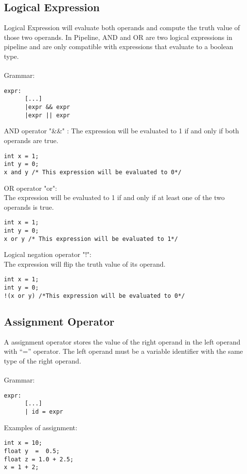 \documentclass[./LRM_main.tex]{subfiles}
\begin{document}
\subsection{Logical Expression}
Logical Expression will evaluate both operands and compute the truth value of those two operands. In Pipeline, AND and OR are two logical expressions in pipeline and are only compatible with expressions that evaluate to a boolean type.\\
\vspace{1 mm}\\
Grammar:
\begin{lstlisting}
expr:
  	  [...]   
      |expr && expr
      |expr || expr

\end{lstlisting}
AND operator "\&\&" :
The expression will be evaluated to 1 if and only if both operands are true.
\begin{lstlisting}
int x = 1;
int y = 0;
x and y /* This expression will be evaluated to 0*/
\end{lstlisting}
OR operator "or":\\
The expression will be evaluated to 1 if and only if at least one of the two operands is true.
\begin{lstlisting}
int x = 1;
int y = 0;
x or y /* This expression will be evaluated to 1*/
\end{lstlisting}
Logical negation operator "!":\\
The expression will flip the truth value of its operand.
\begin{lstlisting}
int x = 1;
int y = 0;
!(x or y) /*This expression will be evaluated to 0*/
\end{lstlisting}
\subsection{Assignment Operator}
A assignment operator stores the value of the right operand in the left operand with “=” operator. The left operand must be a variable identifier with the same type of the right operand.\\
\vspace{1 mm}\\
Grammar:
\begin{lstlisting}
expr:
	  [...]
      | id = expr

\end{lstlisting}
\vspace{1 mm}
Examples of assignment:
\begin{lstlisting}
int x = 10; 
float y  =  0.5;  
float z = 1.0 + 2.5;
x = 1 + 2;
\end{lstlisting}	
\end{document}
